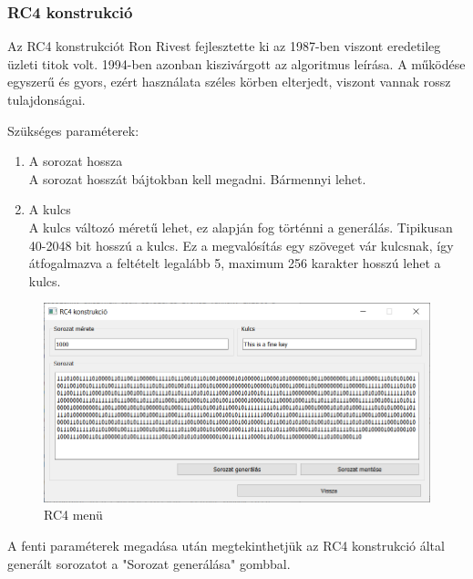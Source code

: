 \documentclass[hidelinks, 12pt]{article}
\begin{document}
	\subsubsection{RC4 konstrukció}
	Az RC4 konstrukciót Ron Rivest fejlesztette ki az 1987-ben viszont eredetileg üzleti titok volt. 1994-ben azonban kiszivárgott az algoritmus leírása. \cite{rcleak} A működése egyszerű és gyors, ezért használata széles körben elterjedt, viszont vannak rossz tulajdonságai.
	\par
	Szükséges paraméterek:
	\begin{enumerate}
		\bfseries\item A sorozat hossza \\
		\normalfont A sorozat hosszát bájtokban kell megadni. Bármennyi lehet.
		\bfseries \item A kulcs
		\\
		\normalfont A kulcs változó méretű lehet, ez alapján fog történni a generálás. Tipikusan 40-2048 bit hosszú a kulcs. Ez a megvalósítás egy szöveget vár kulcsnak, így átfogalmazva a feltételt legalább 5, maximum 256 karakter hosszú lehet a kulcs.
	\end{enumerate}
	\begin{figure}[h]
		\centering
		\begin{minipage}{\textwidth} %
			\includegraphics[width=\textwidth]{RC4menu.png}
		\end{minipage}
		\caption{RC4 menü}
	\end{figure}
	A fenti paraméterek megadása után megtekinthetjük az RC4 konstrukció által generált sorozatot a "Sorozat generálása" gombbal.
\end{document}
